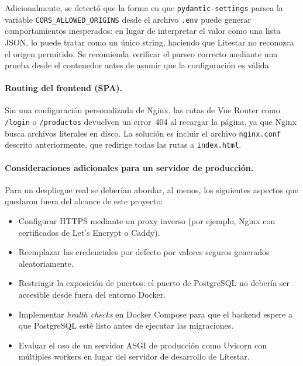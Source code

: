 Adicionalmente, se detectó que la forma en que \texttt{pydantic-settings} parsea la variable
\texttt{CORS\_ALLOWED\_ORIGINS} desde el archivo \texttt{.env} puede generar
comportamientos inesperados: en lugar de interpretar el valor como una lista JSON, lo puede
tratar como un único string, haciendo que Litestar no reconozca el origen permitido. Se
recomienda verificar el parseo correcto mediante una prueba desde el contenedor antes de
asumir que la configuración es válida.

\paragraph{Routing del frontend (SPA).}
Sin una configuración personalizada de Nginx, las rutas de Vue Router como \texttt{/login}
o \texttt{/productos} devuelven un error~404 al recargar la página, ya que Nginx busca
archivos literales en disco. La solución es incluir el archivo \texttt{nginx.conf} descrito
anteriormente, que redirige todas las rutas a \texttt{index.html}.

\paragraph{Consideraciones adicionales para un servidor de producción.}
Para un despliegue real se deberían abordar, al menos, los siguientes aspectos que quedaron
fuera del alcance de este proyecto:

\begin{itemize}
	\item Configurar HTTPS mediante un proxy inverso (por ejemplo, Nginx con certificados de
	Let's Encrypt o Caddy).
	\item Reemplazar las credenciales por defecto por valores seguros generados aleatoriamente.
	\item Restringir la exposición de puertos: el puerto de PostgreSQL no debería ser accesible
	desde fuera del entorno Docker.
	\item Implementar \emph{health checks} en Docker Compose para que el backend espere a que
	PostgreSQL esté listo antes de ejecutar las migraciones.
	\item Evaluar el uso de un servidor ASGI de producción como Uvicorn con múltiples workers
	en lugar del servidor de desarrollo de Litestar.
\end{itemize}